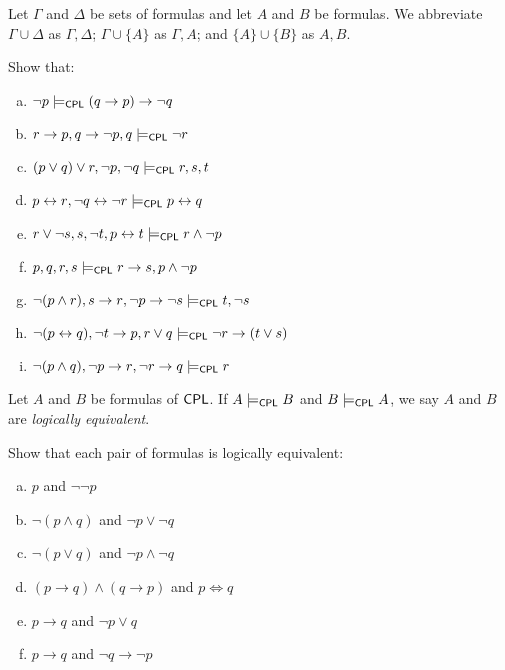 \documentclass{article}
\begin{document}
\begin{notation} 
    Let $\Gamma$ and $\Delta$ be sets of formulas and let $A$ and $B$ be formulas. We abbreviate $\Gamma \cup \Delta$ as $\Gamma, \Delta$; $\Gamma \cup \{ A \}$ as $\Gamma, A$; and $\{ A \} \cup \{ B \}$ as $A, B$.
\end{notation}

\begin{prob}{2.2}
    Show that:
    \begin{multicols}{2}
    \begin{enumerate}[a)]
    \item $\neg p \models_{\mathsf{CPL}} (q \to p) \to \neg q$
    \item ${r \to p}, {q \to \neg p}, q \models_{\mathsf{CPL}} \neg r$
    \item $(p \vee q) \vee r, \neg p, \neg q \models_{\mathsf{CPL}} r, s, t$
    \item ${p \leftrightarrow r}, {\neg q \leftrightarrow \neg r} \models_{\mathsf{CPL}} {p \leftrightarrow q}$
    \item ${r \vee \neg s}, s, \neg t, {p \leftrightarrow t} \models_{\mathsf{CPL}} {r \wedge \neg p}$
    \item $p, q, r, s \models_{\mathsf{CPL}} {r \to s}, {p \wedge \neg p}$
    \item ${\neg (p \wedge r)}, {s \to r}, {\neg p \to \neg s} \models_{\mathsf{CPL}} t, {\neg s}$
    \item ${\neg (p \leftrightarrow q)}, {\neg t \to p}, {r \vee q} \models_{\mathsf{CPL}} {\neg r \to (t \vee s)}$
    \item ${\neg (p \wedge q)}, {\neg p \to r}, {\neg r \to q} \models_{\mathsf{CPL}} r$
    \end{enumerate}
    \end{multicols}
\end{prob}

\begin{definition}
    Let $A$ and $B$ be formulas of $\mathsf{CPL}$. If $A \models_{\mathsf{CPL}} B$ and $B \models_{\mathsf{CPL}} A$, we say $A$ and $B$ are \emph{logically equivalent}.
\end{definition}

\begin{prob}{2.3}
    Show that each pair of formulas is logically equivalent:
    \begin{multicols}{2}
    \begin{enumerate}[a)]
    \item $p$ and $\neg \neg p$
    \item $\neg (p \wedge q)$ and $\neg p \vee \neg q$
    \item $\neg (p \vee q)$ and $\neg p \wedge \neg q$
    \item $(p \to q) \wedge (q \to p)$ and $p \iff q$
    \item $p \to q$ and $\neg p \vee q$
    \item $p \to q$ and $\neg q \to \neg p$
    \end{enumerate}
    \end{multicols}
\end{prob}
\end{document}
